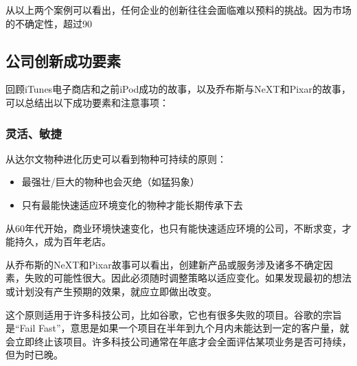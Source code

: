 
从以上两个案例可以看出，任何企业的创新往往会面临难以预料的挑战。因为市场的不确定性，超过90%


\hypertarget{ux516cux53f8ux5982ux4f55ux521bux65b0-1}{%
\subsection{公司创新成功要素}\label{ux516cux53f8ux5982ux4f55ux521bux65b0-1}}

回顾iTunes电子商店和之前iPod成功的故事，以及乔布斯与NeXT和Pixar的故事，可以总结出以下成功要素和注意事项： 

\hypertarget{ux7075ux6d3bux654fux6377}{%
\subsubsection{灵活、敏捷}\label{ux7075ux6d3bux654fux6377}}

从达尔文物种进化历史可以看到物种可持续的原则：

\begin{itemize}
\tightlist
\item
  最强壮/巨大的物种也会灭绝（如猛犸象）
\item
  只有最能快速适应环境变化的物种才能长期传承下去
\end{itemize}

从60年代开始，商业环境快速变化，也只有能快速适应环境的公司，不断求变，才能持久，成为百年老店。

从乔布斯的NeXT和Pixar故事可以看出，创建新产品或服务涉及诸多不确定因素，失败的可能性很大。因此必须随时调整策略以适应变化。如果发现最初的想法或计划没有产生预期的效果，就应立即做出改变。

这个原则适用于许多科技公司，比如谷歌，它也有很多失败的项目。谷歌的宗旨是“Fail Fast”，意思是如果一个项目在半年到九个月内未能达到一定的客户量，就会立即终止该项目。许多科技公司通常在年底才会全面评估某项业务是否可持续，但为时已晚。

